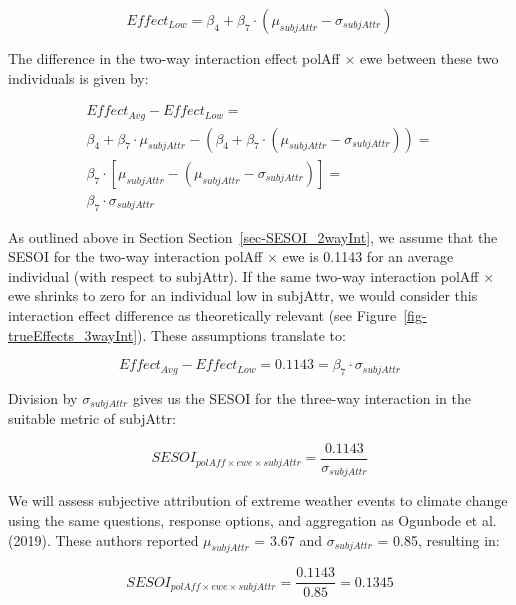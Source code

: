 \documentclass[
  letterpaper,
  DIV=11,
  numbers=noendperiod]{scrartcl}
\begin{document}
\[
Effect_{Low} = \beta_{4} + \beta_{7} \cdot (\mu_{subjAttr} - \sigma_{subjAttr})
\]

The difference in the two-way interaction effect polAff × ewe between
these two individuals is given by:

\[
\begin{split}
Effect_{Avg} - Effect_{Low} = \\
\beta_{4} + \beta_{7} \cdot \mu_{subjAttr} - (\beta_{4} + \beta_{7} \cdot (\mu_{subjAttr} - \sigma_{subjAttr})) = \\
\beta_{7} \cdot [\mu_{subjAttr} - (\mu_{subjAttr} - \sigma_{subjAttr})] = \\
\beta_{7} \cdot \sigma_{subjAttr}
\end{split}
\]

As outlined above in Section Section~\ref{sec-SESOI_2wayInt}, we assume
that the SESOI for the two-way interaction polAff × ewe is 0.1143 for an
average individual (with respect to subjAttr). If the same two-way
interaction polAff × ewe shrinks to zero for an individual low in
subjAttr, we would consider this interaction effect difference as
theoretically relevant (see Figure~\ref{fig-trueEffects_3wayInt}). These
assumptions translate to:

\[
Effect_{Avg} - Effect_{Low} = 0.1143 = \beta_{7} \cdot \sigma_{subjAttr}
\]

Division by \(\sigma_{subjAttr}\) gives us the SESOI for the three-way
interaction in the suitable metric of subjAttr:

\[
SESOI_{polAff \times ewe \times subjAttr} = \frac{0.1143}{\sigma_{subjAttr}}
\]

We will assess subjective attribution of extreme weather events to
climate change using the same questions, response options, and
aggregation as Ogunbode et al. (2019). These authors reported
\(\mu_{subjAttr}\) = 3.67 and \(\sigma_{subjAttr}\) = 0.85, resulting
in:

\[
SESOI_{polAff \times ewe \times subjAttr} = \frac{0.1143}{0.85} = 0.1345
\]
\end{document}
